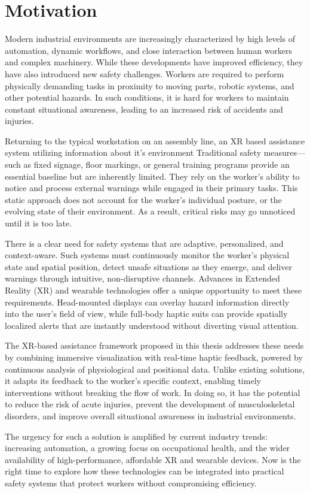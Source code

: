 \chapter{Motivation}
\label{chap:motivation}
Modern industrial environments are increasingly characterized by high levels of automation, dynamic workflows, and close interaction between human workers and complex machinery. While these developments have improved efficiency, they have also introduced new safety challenges. Workers are required to perform physically demanding tasks in proximity to moving parts, robotic systems, and other potential hazards. In such conditions, it is hard for workers to maintain constant situational awareness, leading to an increased risk of accidents and injuries.

Returning to the typical workstation on an assembly line, an XR based assistance system utilizing information about it's environment  
Traditional safety measures—such as fixed signage, floor markings, or general training programs provide an essential baseline but are inherently limited. They rely on the worker’s ability to notice and process external warnings while engaged in their primary tasks. This static approach does not account for the worker’s individual posture, or the evolving state of their environment. As a result, critical risks may go unnoticed until it is too late.

There is a clear need for safety systems that are adaptive, personalized, and context-aware. Such systems must continuously monitor the worker’s physical state and spatial position, detect unsafe situations as they emerge, and deliver warnings through intuitive, non-disruptive channels. Advances in Extended Reality (XR) and wearable technologies offer a unique opportunity to meet these requirements. Head-mounted displays can overlay hazard information directly into the user’s field of view, while full-body haptic suits can provide spatially localized alerts that are instantly understood without diverting visual attention.

The XR-based assistance framework proposed in this thesis addresses these needs by combining immersive visualization with real-time haptic feedback, powered by continuous analysis of physiological and positional data. Unlike existing solutions, it adapts its feedback to the worker’s specific context, enabling timely interventions without breaking the flow of work. In doing so, it has the potential to reduce the risk of acute injuries, prevent the development of musculoskeletal disorders, and improve overall situational awareness in industrial environments.

The urgency for such a solution is amplified by current industry trends: increasing automation, a growing focus on occupational health, and the wider availability of high-performance, affordable XR and wearable devices. Now is the right time to explore how these technologies can be integrated into practical safety systems that protect workers without compromising efficiency.

